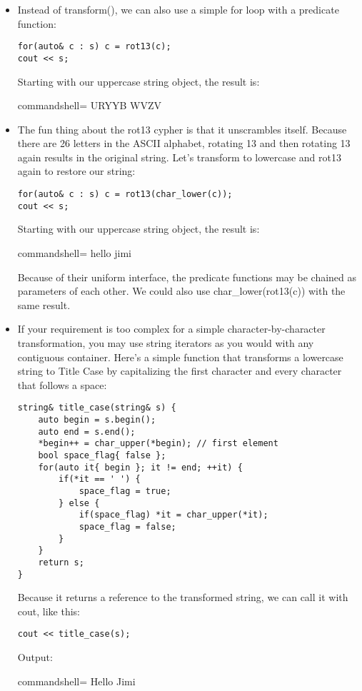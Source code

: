 \begin{itemize}
\item 
Instead of transform(), we can also use a simple for loop with a predicate function:

\begin{lstlisting}[style=styleCXX]
for(auto& c : s) c = rot13(c);
cout << s;
\end{lstlisting}

Starting with our uppercase string object, the result is:

\begin{tcblisting}{commandshell={}}
URYYB WVZV
\end{tcblisting}

\item 
The fun thing about the rot13 cypher is that it unscrambles itself. Because there are 26 letters in the ASCII alphabet, rotating 13 and then rotating 13 again results in the original string. Let's transform to lowercase and rot13 again to restore our string:

\begin{lstlisting}[style=styleCXX]
for(auto& c : s) c = rot13(char_lower(c));
cout << s;
\end{lstlisting}

Starting with our uppercase string object, the result is:

\begin{tcblisting}{commandshell={}}
hello jimi
\end{tcblisting}

Because of their uniform interface, the predicate functions may be chained as parameters of each other. We could also use char\_lower(rot13(c)) with the same result.

\item 
If your requirement is too complex for a simple character-by-character transformation, you may use string iterators as you would with any contiguous container. Here's a simple function that transforms a lowercase string to Title Case by capitalizing the first character and every character that follows a space:

\begin{lstlisting}[style=styleCXX]
string& title_case(string& s) {
	auto begin = s.begin();
	auto end = s.end();
	*begin++ = char_upper(*begin); // first element
	bool space_flag{ false };
	for(auto it{ begin }; it != end; ++it) {
		if(*it == ' ') {
			space_flag = true;
		} else {
			if(space_flag) *it = char_upper(*it);
			space_flag = false;
		}
	}
	return s;
}
\end{lstlisting}

Because it returns a reference to the transformed string, we can call it with cout, like this:

\begin{lstlisting}[style=styleCXX]
cout << title_case(s);
\end{lstlisting}

Output:

\begin{tcblisting}{commandshell={}}
Hello Jimi
\end{tcblisting}

\end{itemize}

